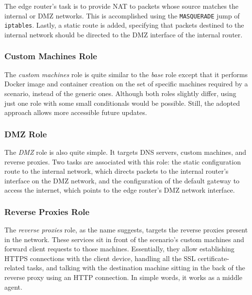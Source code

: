 The edge router's task is to provide NAT to packets whose source matches the internal or DMZ networks. This is accomplished using the \texttt{MASQUERADE} jump of \texttt{iptables}. Lastly, a static route is added, specifying that packets destined to the internal network should be directed to the DMZ interface of the internal router.

\subsubsection{Custom Machines Role} \label{sec:ansible_custom_machines_role}

The \textit{custom machines} role is quite similar to the \textit{base} role except that it performs Docker image and container creation on the set of specific machines required by a scenario, instead of the generic ones. Although both roles slightly differ, using just one role with some small conditionals would be possible. Still, the adopted approach allows more accessible future updates.

\subsubsection{DMZ Role} \label{sec:ansible_dmz_role}

The \textit{DMZ} role is also quite simple. It targets DNS servers, custom machines, and reverse proxies. Two tasks are associated with this role: the static configuration route to the internal network, which directs packets to the internal router's interface on the DMZ network, and the configuration of the default gateway to access the internet, which points to the edge router's DMZ network interface.

\subsubsection{Reverse Proxies Role} \label{sec:ansible_reverse_proxies_role}

The \textit{reverse proxies} role, as the name suggests, targets the reverse proxies present in the network. These services sit in front of the scenario's custom machines and forward client requests to those machines. Essentially, they allow establishing HTTPS connections with the client device, handling all the SSL certificate-related tasks, and talking with the destination machine sitting in the back of the reverse proxy using an HTTP connection. In simple words, it works as a middle agent.

